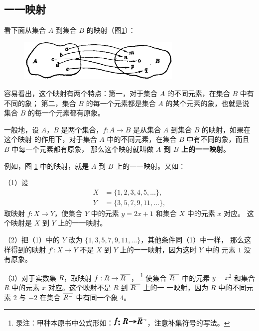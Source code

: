 \subsection{一一映射}

看下面从集合 $A$ 到集合 $B$ 的映射（图\ref{fig:1-23}）：

\begin{figure}[htbp]
    \centering
    \includegraphics[width=0.7\textwidth]{pic/1-23}
    \caption{}\label{fig:1-23}
\end{figure}

容易看出，这个映射有两个特点：第一，对于集合 $A$ 的不同元素，在集合 $B$ 中有不同的象；
第二，集合 $B$ 的每一个元素都是集合 $A$ 的某个元素的象，也就是说集合 $B$ 的每一个元素都有原象。

一般地，设 $A$，$B$ 是两个集合，$f: A \to B$ 是从集合 $A$ 到集合 $B$ 的映射，如果在这个映射
的作用下，对于集合 $A$ 中的不同元素，在集合 $B$ 中有不同的象，而且 $B$ 中每一个元素都有原象，
那么这个映射就叫做 \textbf{$A$ 到 $B$ 上的一一映射}。

例如，图 \ref{fig:1-23} 中的映射，就是 $A$ 到 $B$ 上的一一映射。又如：

（1）设
\begin{align*}
    X &= \{1, 2, 3, 4, 5, \dots \},\\
    Y &= \{3, 5, 7, 9, 11, \dots \},
\end{align*}
取映射 $f: X \to Y$，使集合 $Y$ 中的元素 $y = 2x + 1$ 和集合 $X$ 中的元素 $x$ 对应。
这个映射是 $X$ 到 $Y$ 上的一一映射。

（2）把（1）中的 $Y$ 改为 $\{1, 3, 5, 7, 9, 11, \dots \}$，其他条件同（1）中一样，
那么这样得到的映射 $f': X \to Y$ 不是 $X$ 到 $Y$ 上的一一映射，因为这时 $Y$ 中的
元素 $1$ 没有原象。

（3）对于实数集 $R$，取映射 $f: R \to \overline{R^-}$，
\footnote{录注：甲种本原书中公式形如：\includegraphics[width=1.8cm]{pic/ch-1-8-1}，注意补集符号的写法。}
使集合 $\overline{R^-}$ 中的元素 $y = x^2$ 和集合 $R$ 中的元素 $x$ 对应。这个映射不是 $R$ 到 $\overline{R^-}$ 上的一
一映射，因为 $R$ 中的不同元素 $2$ 与 $-2$ 在集合 $\overline{R^-}$ 中有同一个象 $4$。

